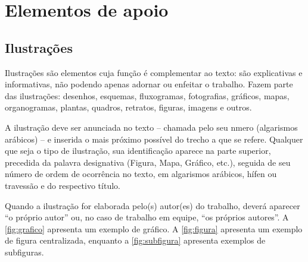 \documentclass[12pt,oneside,a4paper,chapter=TITLE,section=TITLE,sumario=tradicional]{abntex2}
\begin{document}
\chapter{Elementos de apoio}
\label{cap:apoio}

\section{Ilustrações}
\label{cap:ilustracoes}

Ilustrações são elementos cuja função é complementar ao texto: são explicativas 
e informativas, não podendo apenas adornar ou enfeitar o trabalho. Fazem parte 
das ilustrações: desenhos, esquemas, fluxogramas, fotografias, gráficos, mapas, 
organogramas, plantas, quadros, retratos, figuras, imagens e outros.

A ilustração deve ser anunciada no texto – chamada pelo seu nmero (algarismos 
arábicos) – e inserida o mais próximo possível do trecho a que se refere.
Qualquer que seja o tipo de ilustração, sua identificação aparece na parte 
superior, precedida da palavra designativa (Figura, Mapa, Gráfico, etc.), 
seguida de seu número de ordem de ocorrência no texto, em algarismos arábicos, 
hífen ou travessão e do respectivo título.

Quando a ilustração for elaborada pelo(s) autor(es) do trabalho, deverá 
aparecer ``o próprio autor'' ou, no caso de trabalho em equipe, ``os próprios 
autores''. A \autoref{fig:grafico} apresenta um exemplo de gráfico. A 
\autoref{fig:figura} apresenta um exemplo de figura centralizada, enquanto a 
\autoref{fig:subfigura} apresenta exemplos de subfiguras.

\begin{grafico}[htb]
\end{grafico}

\begin{figure}[htb]
\end{figure}

\begin{figure}[htb]
    \hfil
    \hfil
    
    \hfil
    \hfil
    
\end{figure}
\end{document}
